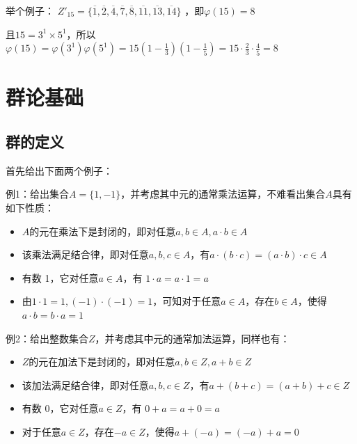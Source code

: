 \documentclass[12pt]{article}
\begin{document}
\begin{framed}
\small{
举个例子：
$Z'_{15} = \{\overline{1}, \overline{2}, \overline{4}, \overline{7}, \overline{8}, \overline{11}, \overline{13}, \overline{14}\}$
，即$\varphi(15) = 8$

且$15 = 3^1 \times 5^1$，所以$\varphi(15) = \varphi(3^1)\varphi(5^1) = 15(1-\frac{1}{3})(1-\frac{1}{5}) = 15
\cdot \frac{2}{3} \cdot \frac{4}{5} = 8$
}
\end{framed}

\section{群论基础}
\subsection{群的定义}

\begin{framed}
\small{
首先给出下面两个例子：

例1：给出集合$A = \{1, -1\}$，并考虑其中元的通常乘法运算，不难看出集合$A$具有如下性质：
\begin{itemize}
\setlength{\itemsep}{0pt}
\setlength{\parsep}{0pt}
\setlength{\parskip}{0pt}
    \item $A$的元在乘法下是封闭的，即对任意$a,b \in A, a\cdot b \in A$
    \item 该乘法满足结合律，即对任意$a,b,c \in A$，有$ a\cdot (b\cdot c) = (a\cdot b)\cdot c \in A$
    \item 有数 1，它对任意$a \in A$，有 $1 \cdot a = a \cdot 1 = a$
    \item 由$1 \cdot 1 = 1, (-1) \cdot (-1) = 1$，可知对于任意$a \in A$，存在$b \in A$，使得$a\cdot b = b\cdot a = 1$
\end{itemize}

例2：给出整数集合$Z$，并考虑其中元的通常加法运算，同样也有：
\begin{itemize}
\setlength{\itemsep}{0pt}
\setlength{\parsep}{0pt}
\setlength{\parskip}{0pt}
    \item $Z$的元在加法下是封闭的，即对任意$a,b \in Z, a+b \in Z$
    \item 该加法满足结合律，即对任意$a,b,c \in Z$，有$ a + (b + c) = (a + b) + c \in Z$
    \item 有数 0，它对任意$a \in Z$，有 $0 + a = a + 0 = a$
    \item 对于任意$a \in Z$，存在$-a \in Z$，使得$a + (-a) = (-a)+ a = 0$
\end{itemize}
}
\end{framed}
\end{document}
